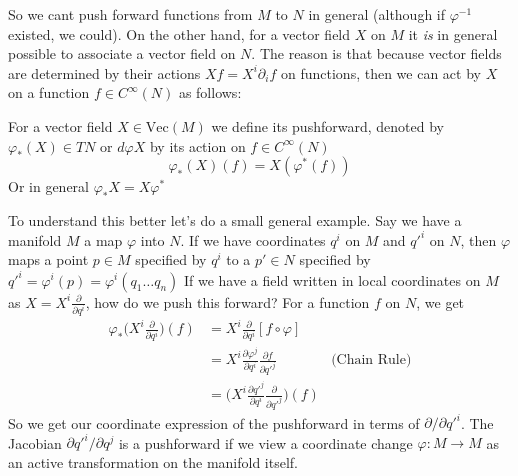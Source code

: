 		So we cant push forward functions from $M$ to $N$ in general (although if $\varphi^{-1}$ existed, we could). On the other hand, for a vector field $X$ on $M$ it \emph{is} in general possible to associate a vector field on $N$. The reason is that because vector fields are determined by their actions $Xf = X^i \partial_i f$ on functions, then we can act by $X$ on a function $f \in C^{\infty} (N)$ as follows:
		\begin{defn}
			For a vector field $X \in \text{Vec}(M)$ we define its pushforward, denoted by $\varphi_*(X) \in TN$ or $d\varphi X$ by its action on $f \in C^\infty(N)$
			\begin{equation*}
				\varphi_*(X)(f) = X (\varphi^*(f))
			\end{equation*}
			Or in general $\varphi_* X= X \varphi^*$
		\end{defn}
		To understand this better let's do a small general example.
		Say we have a manifold $M$ a map $\varphi$ into $N$. If we have coordinates $q^i$ on $M$ and $q'^i$ on $N$, then $\varphi$ maps a point $p \in M$ specified by $q^i$ to a $p'\in N$ specified by $q'^i = \varphi^i (p) = \varphi^i(q_1 \dots q_n)$
		 If we have a field written in local coordinates on $M$ as $X=X^i \frac{\partial}{\partial q^i}$, how do we push this forward? For a function $f$ on $N$, we get
		\begin{align*}
			\varphi_* \Big(X^i \frac{\partial}{\partial q^i}\Big)(f) &= X^i \frac{\partial}{\partial q^i} [f\circ \varphi] &\\
			&= X^i \frac{\partial \varphi^j}{\partial q^i} \frac{\partial f}{\partial q'^j} & \text{(Chain Rule)}\\
			&= \Big(X^i \frac{\partial q'^j}{\partial q^i} \frac{\partial}{\partial q'^j}\Big)(f)
		\end{align*}
		So we get our coordinate expression of the pushforward in terms of $\partial/\partial q'^i$. The Jacobian $\partial q'^i/\partial q^j$ is a pushforward if we view a coordinate change $\varphi:M \rightarrow M$ as an active transformation on the  manifold itself. 
			
